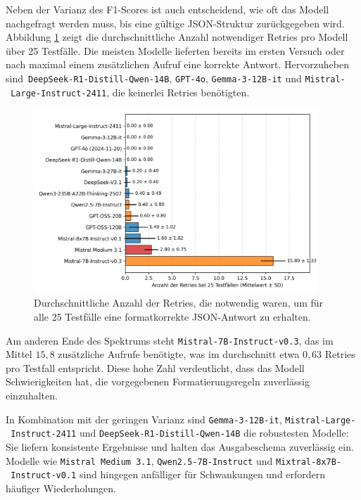 Neben der Varianz des F1-Scores ist auch entscheidend, wie oft das Modell nachgefragt werden muss, bis eine gültige JSON-Struktur zurückgegeben wird. Abbildung \ref{fig:results_evaluation_amount_of_retries} zeigt die durchschnittliche Anzahl notwendiger Retries pro Modell über 25 Testfälle. Die meisten Modelle lieferten bereits im ersten Versuch oder nach maximal einem zusätzlichen Aufruf eine korrekte Antwort. Hervorzuheben sind\linebreak~\texttt{DeepSeek-R1-Distill-Qwen-14B}, \texttt{GPT-4o}, \texttt{Gemma-3-12B-it} und \texttt{Mistral-\linebreak~Large-Instruct-2411}, die keinerlei Retries benötigten.

\begin{figure}[htbp]
    \centering
    \includegraphics[width=0.95\textwidth]{images/results/evaluation_amount_of_retries_}
    \caption{Durchschnittliche Anzahl der Retries, die notwendig waren, um für alle 25 Testfälle eine formatkorrekte JSON-Antwort zu erhalten.}
    \label{fig:results_evaluation_amount_of_retries}
\end{figure}

Am anderen Ende des Spektrums steht \texttt{Mistral-7B-Instruct-v0.3}, das im Mittel $15{,}8$ zusätzliche Aufrufe benötigte, was im durchschnitt etwa $0{,}63$ Retries pro Testfall entspricht. Diese hohe Zahl verdeutlicht, dass das Modell Schwierigkeiten hat, die vorgegebenen Formatierungsregeln zuverlässig einzuhalten.

In Kombination mit der geringen Varianz sind \texttt{Gemma-3-12B-it}, \texttt{Mistral-Large-\linebreak~Instruct-2411} und \texttt{DeepSeek-R1-Distill-Qwen-14B} die robustesten Modelle: Sie liefern konsistente Ergebnisse und halten das Ausgabeschema zuverlässig ein. Modelle wie \texttt{Mistral Medium 3.1}, \texttt{Qwen2.5-7B-Instruct} und \texttt{Mixtral-8x7B-\linebreak~Instruct-v0.1} sind hingegen anfälliger für Schwankungen und erfordern häufiger Wiederholungen.